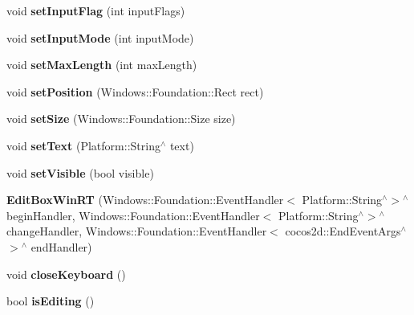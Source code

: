 \begin{DoxyCompactItemize}
void {\bfseries set\+Input\+Flag} (int input\+Flags)
\item 
\mbox{\label{classui_1_1sealed_a758cf93a8ac3da42e92a8b611e1c3b46}} 
void {\bfseries set\+Input\+Mode} (int input\+Mode)
\item 
\mbox{\label{classui_1_1sealed_ab041cba2fe6ed5d71b93305da3374c75}} 
void {\bfseries set\+Max\+Length} (int max\+Length)
\item 
\mbox{\label{classui_1_1sealed_ac0a9ae3cc307348f696e3c56744f3d7b}} 
void {\bfseries set\+Position} (Windows\+::\+Foundation\+::\+Rect rect)
\item 
\mbox{\label{classui_1_1sealed_afddef2cad71aac6fd5c484f2c5abcb0f}} 
void {\bfseries set\+Size} (Windows\+::\+Foundation\+::\+Size size)
\item 
\mbox{\label{classui_1_1sealed_a1ed25b1833671a4331a95296881cfdbc}} 
void {\bfseries set\+Text} (Platform\+::\+String$^\wedge$ text)
\item 
\mbox{\label{classui_1_1sealed_a53e7a0fa53fce56e8b5ddc91814dfc08}} 
void {\bfseries set\+Visible} (bool visible)
\item 
\mbox{\label{classui_1_1sealed_a638fd1448b4ce22a75b45768e9817652}} 
{\bfseries Edit\+Box\+Win\+RT} (Windows\+::\+Foundation\+::\+Event\+Handler$<$ Platform\+::\+String$^\wedge$$>$$^\wedge$ begin\+Handler, Windows\+::\+Foundation\+::\+Event\+Handler$<$ Platform\+::\+String$^\wedge$$>$$^\wedge$ change\+Handler, Windows\+::\+Foundation\+::\+Event\+Handler$<$ cocos2d\+::\+End\+Event\+Args$^\wedge$$>$$^\wedge$ end\+Handler)
\item 
\mbox{\label{classui_1_1sealed_a39a9a1a6ae83b06c85de7fd432e3be6a}} 
void {\bfseries close\+Keyboard} ()
\item 
\mbox{\label{classui_1_1sealed_ade59666643f0ae12344dbf881bdf6d38}} 
bool {\bfseries is\+Editing} ()
\item 
\mbox{\label{classui_1_1sealed_a4990f6f13639267e1a6212e9a56949ae}} 

\end{DoxyCompactItemize}
